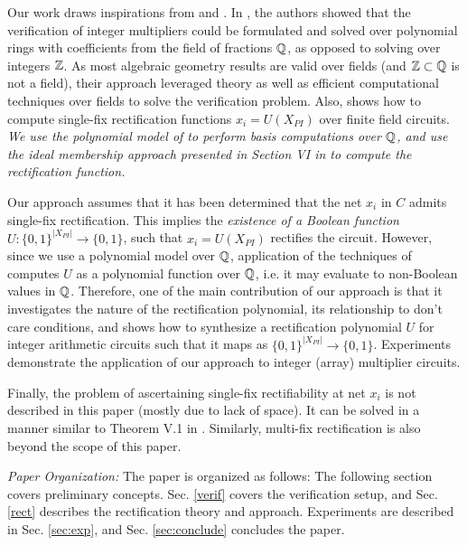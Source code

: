 Our work draws inspirations from \cite{kauffman2017}
\cite{Armin2017ColumnWiseVO} and \cite{utkarsh:fmcad18}. In
\cite{kauffman2017}\cite{Armin2017ColumnWiseVO}, the authors showed
that the verification of integer multipliers could be formulated and
solved over polynomial rings with coefficients from the field of
fractions ${\mathbb{Q}}$, as opposed to solving over integers ${\mathbb{Z}}$. As most
algebraic geometry results are valid over fields (and ${\mathbb{Z}} \subset
{\mathbb{Q}}$ is not a field), their approach leveraged theory as well as
efficient computational techniques over fields to solve the
verification problem. Also, \cite{utkarsh:fmcad18} shows how to
compute single-fix rectification functions $x_i = U(X_{PI})$ over
finite field circuits. {\it We use the polynomial model of
\cite{kauffman2017}   \cite{Armin2017ColumnWiseVO} to perform \Grobner
basis computations over ${\mathbb{Q}}$, and use the ideal membership approach
presented in Section VI in \cite{utkarsh:fmcad18} to compute the
rectification function.} 


Our approach assumes that it has been determined that the net $x_i$ in
$C$ admits single-fix rectification. This implies the {\it existence of a
Boolean function} $U: \{0,1\}^{|X_{PI}|}\rightarrow \{0,1\}$, such
that $x_i = U(X_{PI})$ rectifies the circuit. However, since we use a
polynomial model over ${\mathbb{Q}}$, application of the techniques of
\cite{utkarsh:fmcad18} computes $U$ as a polynomial function over
${\mathbb{Q}}$, i.e. it may evaluate to non-Boolean values in ${\mathbb{Q}}$. Therefore,
one of the main contribution of our approach is that it investigates
the nature of the rectification polynomial, its relationship to don't
care conditions, and shows how to synthesize a rectification
polynomial $U$ for integer arithmetic circuits such that it maps as
$\{0,1\}^{|X_{PI}|} \rightarrow \{0,1\}$. Experiments demonstrate the
application of our approach to integer (array) multiplier circuits. 

Finally, the problem of ascertaining single-fix rectifiability at net
$x_i$ is not described in this paper (mostly due to lack of space). It
can be solved in a manner similar to Theorem V.1 in
\cite{utkarsh:fmcad18}. Similarly, multi-fix rectification is also
beyond the scope of this paper. 

{\it Paper Organization:} The paper is organized as follows: The
following section covers preliminary concepts. Sec. \ref{verif} covers
the verification setup, and Sec. \ref{rect} describes the rectification
theory and approach. Experiments are described in Sec. \ref{sec:exp},
and Sec. \ref{sec:conclude} concludes the paper. 
